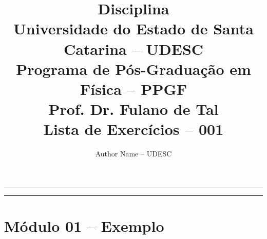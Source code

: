 \documentclass[
  a4paper,
  12pt
]{article}
\title{%
  Disciplina\texorpdfstring{\\
    \large{
      Universidade do Estado de Santa Catarina -- UDESC\\
      Programa de Pós-Graduação em Física -- PPGF\\
    }
    \bigskip
    \normalsize{
      Prof. Dr. Fulano de Tal \\
      Lista de Exercícios -- 001
    }
  }{}
}
\author{Author Name -- UDESC}
\numberwithin{equation}{section}
\begin{document}
  \maketitle

  \hrule

  \tableofcontents

  \vspace{20pt}

  \hrule
  \section{Módulo 01 -- Exemplo}
  
\end{document}
